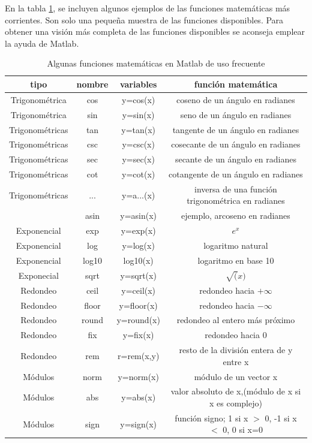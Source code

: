 En la tabla \ref{tabfun}, se incluyen algunos ejemplos de las funciones matemáticas más corrientes. Son solo una pequeña muestra de las funciones disponibles. Para obtener una visión más completa de las funciones disponibles se aconseja emplear la ayuda de Matlab.

\begin{table}
\caption{Algunas funciones matemáticas en Matlab de uso frecuente}
\label{tabfun}
\begin{tabular}{c|c|c|c}
tipo&nombre&variables&función matemática\\
\hline
\hline
Trigonométrica&cos&y=cos(x)&coseno de un ángulo en radianes\\
\hline
Trigonométrica&sin&y=sin(x)&seno de un ángulo en radianes\\
\hline
Trigonométricas&tan&y=tan(x)&tangente de un ángulo en radianes\\
\hline
Trigonométricas&csc&y=csc(x)&cosecante de un ángulo en radianes\\
\hline
Trigonométricas&sec&y=sec(x)&secante de un ángulo en radianes\\
\hline
Trigonométricas&cot&y=cot(x)&cotangente de un ángulo en radianes\\

\hline
Trigonométricas&...&y=a...(x)&inversa de una función trigonométrica en radianes\\
&asin&y=asin(x)&ejemplo, arcoseno en radianes\\
\hline
\hline
Exponencial&exp&y=exp(x)&$e^x$\\
\hline
Exponencial&log&y=log(x)&logaritmo natural\\
\hline
Exponencial&log10&log10(x)&logaritmo en base 10\\
\hline
Exponecial&sqrt&y=sqrt(x)&$\sqrt(x)$\\
\hline
\hline
Redondeo&ceil&y=ceil(x)& redondeo hacia $+\infty$\\
\hline
Redondeo&floor&y=floor(x)&redondeo hacia $-\infty$\\
\hline
Redondeo&round&y=round(x)&redondeo al entero más próximo\\
\hline
Redondeo&fix&y=fix(x)&redondeo hacia $0$\\
\hline
Redondeo&rem&r=rem(x,y)&resto de la división entera de y entre x\\
\hline
\hline
Módulos&norm&y=norm(x)& módulo de un vector x\\
\hline
Módulos&abs&y=abs(x)&valor absoluto de x,(módulo de x si x es complejo)\\
\hline
Módulos&sign&y=sign(x)&función signo; 1 si x $>$ 0, -1 si x $<$ 0, 0 si x=0\\
\end{tabular}
\end{table}

